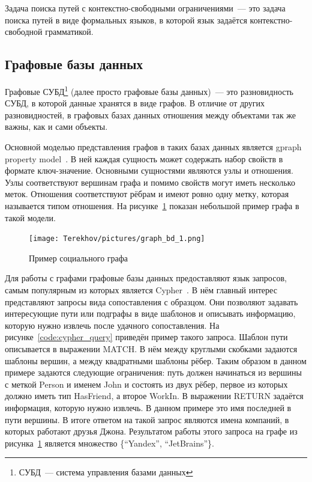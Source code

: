 Задача поиска путей с контекстно-свободными ограничениями~--- это задача поиска путей в виде формальных языков, в которой язык задаётся контекстно-свободной грамматикой.

\subsection{Графовые базы данных}
Графовые СУБД\footnote{СУБД~--- система управления базами данных} (далее просто графовые базы данных)~--- это разновидность СУБД, в которой данные хранятся в виде графов. В отличие от других разновидностей, в графовых базах данных отношения между объектами так же важны, как и сами объекты.

Основной моделью представления графов в таких базах данных является gpraph property model~\cite{graph-propery-model}. В ней каждая сущность может содержать набор свойств в формате ключ-значение. Основными сущностями являются узлы и отношения. Узлы соответствуют вершинам графа и помимо свойств могут иметь несколько меток. Отношения соответствуют рёбрам и имеют ровно одну метку, которая называется типом отношения. На рисунке~\ref{fig:graph_bd_1} показан небольшой пример графа в такой модели. 

\begin{figure}[h]
\centering
    \texttt{[image: Terekhov/pictures/graph\_bd\_1.png]}
    \caption{Пример социального графа}
    \label{fig:graph_bd_1}
\end{figure}

Для работы с графами графовые базы данных предоставляют язык запросов, самым популярным из которых является Cypher~\cite{cypher-language}. В нём главный интерес представляют запросы вида сопоставления с образцом. Они позволяют задавать интересующие пути или подграфы в виде шаблонов и описывать информацию, которую нужно извлечь после удачного сопоставления. На рисунке~\ref{code:cypher_query} приведён пример такого запроса. Шаблон пути описывается в выражении MATCH. В нём между круглыми скобками задаются шаблоны вершин, а между квадратными шаблоны рёбер. Таким образом в данном примере задаются следующие ограничения: путь должен начинаться из вершины с меткой Person и именем John и состоять из двух рёбер, первое из которых должно иметь тип HasFriend, а второе WorkIn. В выражении RETURN задаётся информация, которую нужно извлечь. В данном примере это имя последней в пути вершины. В итоге ответом на такой запрос являются имена компаний, в которых работают друзья Джона. Результатом работы этого запроса на графе из рисунка~\ref{fig:graph_bd_1} является множество \{``Yandex'', ``JetBrains''\}.

